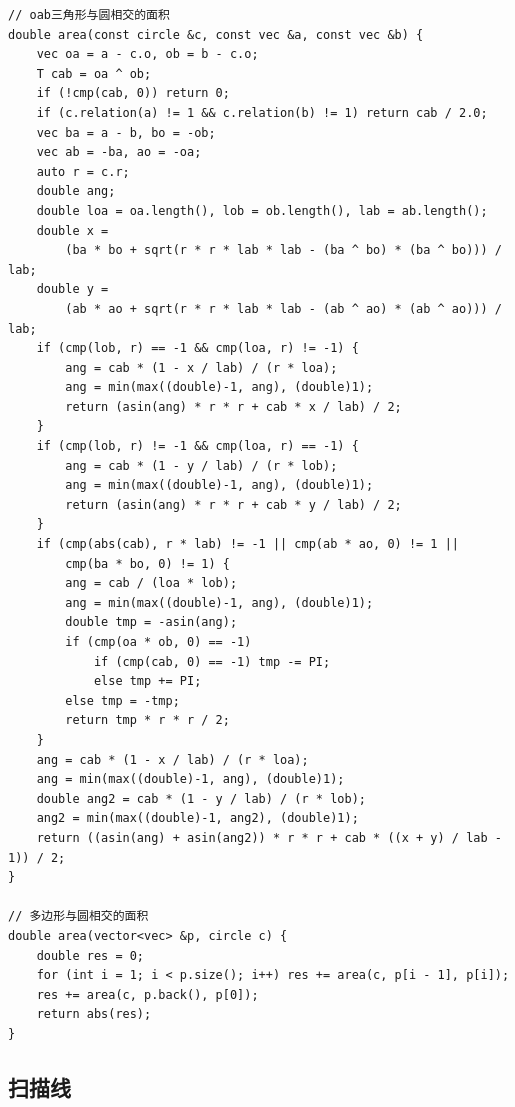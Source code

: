 \documentclass[UTF8]{ctexart}
\begin{document}
\begin{sloppypar}
\begin{lstlisting}[style=cpp]
// oab三角形与圆相交的面积
double area(const circle &c, const vec &a, const vec &b) {
    vec oa = a - c.o, ob = b - c.o;
    T cab = oa ^ ob;
    if (!cmp(cab, 0)) return 0;
    if (c.relation(a) != 1 && c.relation(b) != 1) return cab / 2.0;
    vec ba = a - b, bo = -ob;
    vec ab = -ba, ao = -oa;
    auto r = c.r;
    double ang;
    double loa = oa.length(), lob = ob.length(), lab = ab.length();
    double x =
        (ba * bo + sqrt(r * r * lab * lab - (ba ^ bo) * (ba ^ bo))) / lab;
    double y =
        (ab * ao + sqrt(r * r * lab * lab - (ab ^ ao) * (ab ^ ao))) / lab;
    if (cmp(lob, r) == -1 && cmp(loa, r) != -1) {
        ang = cab * (1 - x / lab) / (r * loa);
        ang = min(max((double)-1, ang), (double)1);
        return (asin(ang) * r * r + cab * x / lab) / 2;
    }
    if (cmp(lob, r) != -1 && cmp(loa, r) == -1) {
        ang = cab * (1 - y / lab) / (r * lob);
        ang = min(max((double)-1, ang), (double)1);
        return (asin(ang) * r * r + cab * y / lab) / 2;
    }
    if (cmp(abs(cab), r * lab) != -1 || cmp(ab * ao, 0) != 1 ||
        cmp(ba * bo, 0) != 1) {
        ang = cab / (loa * lob);
        ang = min(max((double)-1, ang), (double)1);
        double tmp = -asin(ang);
        if (cmp(oa * ob, 0) == -1)
            if (cmp(cab, 0) == -1) tmp -= PI;
            else tmp += PI;
        else tmp = -tmp;
        return tmp * r * r / 2;
    }
    ang = cab * (1 - x / lab) / (r * loa);
    ang = min(max((double)-1, ang), (double)1);
    double ang2 = cab * (1 - y / lab) / (r * lob);
    ang2 = min(max((double)-1, ang2), (double)1);
    return ((asin(ang) + asin(ang2)) * r * r + cab * ((x + y) / lab - 1)) / 2;
}

// 多边形与圆相交的面积
double area(vector<vec> &p, circle c) {
    double res = 0;
    for (int i = 1; i < p.size(); i++) res += area(c, p[i - 1], p[i]);
    res += area(c, p.back(), p[0]);
    return abs(res);
}
\end{lstlisting}

\subsection{扫描线}


\end{sloppypar}
\end{document}
